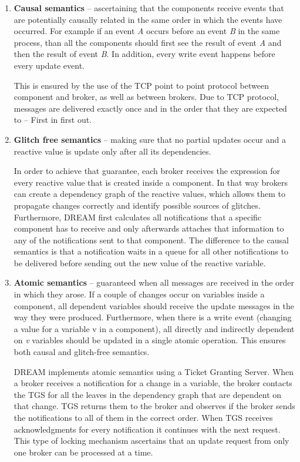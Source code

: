 \documentclass{sigplanconf}
\begin{document}
\begin{enumerate}
  \item \textbf{Causal semantics} -- ascertaining that the components receive events that are potentially causally related in the same order in which the events have occurred. For example if an event \textit{A} occurs before an event \textit{B} in the same process, than all the components should first see the result of event \textit{A} and then the result of event \textit{B}. In addition, every write event happens before every update event.  

This is ensured by the use of the TCP point to point protocol between component and broker, as well as between brokers. Due to TCP protocol, messages are delivered exactly once and in the order that they are expected to -- First in first out.

  \item \textbf{Glitch free semantics} -- making sure that no partial updates occur and a reactive value is update only after all its dependencies. 

In order to achieve that guarantee, each broker receives the expression for every  reactive value that is created inside a component. In that way brokers can create a dependency graph of the reactive values, which allows them to propagate changes correctly and identify possible sources of glitches. Furthermore, DREAM first calculates all notifications that a specific component has to receive and only afterwards attaches that information to any of the notifications sent to that component. The difference to the causal semantics is that a notification waits in a queue for all other notifications to be delivered before sending out the new value of the reactive variable.

  \item \textbf{Atomic semantics} -- guaranteed when all messages are received in the order in which they arose. If a couple of changes occur on variables inside a component, all dependent variables should receive the update messages in the way they were produced. Furthermore, when there is a write event (changing a value for a variable v in a component), all directly and indirectly dependent on \textit{v} variables should be updated in a single atomic operation. This ensures both causal and glitch-free semantics.
  
DREAM implements atomic semantics using a Ticket Granting Server. When a broker receives a notification for a change in a variable, the broker contacts the TGS for all the leaves in the dependency graph that are dependent on that change. TGS returns them to the broker and observes if the broker sends the notifications to all of them in the correct order. When TGS receives acknowledgments for every notification it continues with the next request. This type of locking mechanism ascertains that an update request from only one broker can be processed at a time.

\end{enumerate}
\end{document}
